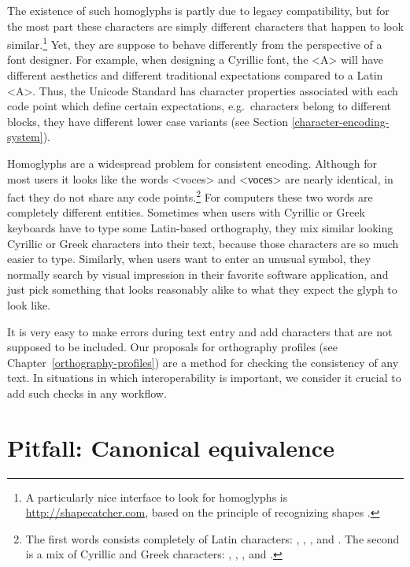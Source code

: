 The existence of such homoglyphs is partly due to legacy compatibility, but for
the most part these characters are simply different characters that happen to
look similar.\footnote{A particularly nice interface to look for homoglyphs is
\url{http://shapecatcher.com}, based on the principle of recognizing shapes
\citep{Belongie2002}.} Yet, they are suppose to behave differently from the
perspective of a font designer. For example, when designing a Cyrillic font, the
<A> will have different aesthetics and different traditional expectations
compared to a Latin <A>. Thus, the Unicode Standard has character properties 
associated with each code point which define certain expectations, e.g.\ characters 
belong to different blocks, they have different lower case variants (see 
Section \ref{character-encoding-system}).

Homoglyphs are a widespread problem for consistent encoding. Although for
most users it looks like the words <voces> and <νοсеѕ> are nearly identical, in 
fact they do not share any code points.\footnote{The first words
consists completely of Latin characters: , ,
,  and . The second is a mix of Cyrillic
and Greek characters: , , , 
and .} For computers these two words are completely different
entities. Sometimes when users with Cyrillic or Greek keyboards have to type
some Latin-based orthography, they mix similar looking Cyrillic or Greek
characters into their text, because those characters are so much easier to type.
Similarly, when users want to enter an unusual symbol, they normally search by
visual impression in their favorite software application, and just pick
something that looks reasonably alike to what they expect the glyph to look
like.

It is very easy to make errors during text entry and add characters that are 
not supposed to be included. Our proposals for orthography profiles (see
Chapter~\ref{orthography-profiles}) are a method for checking the consistency of 
any text. In situations in which interoperability is important, we consider it 
crucial to add such checks in any workflow.

\section{Pitfall: Canonical equivalence}
\label{pitfall-canonical-equivalence}

